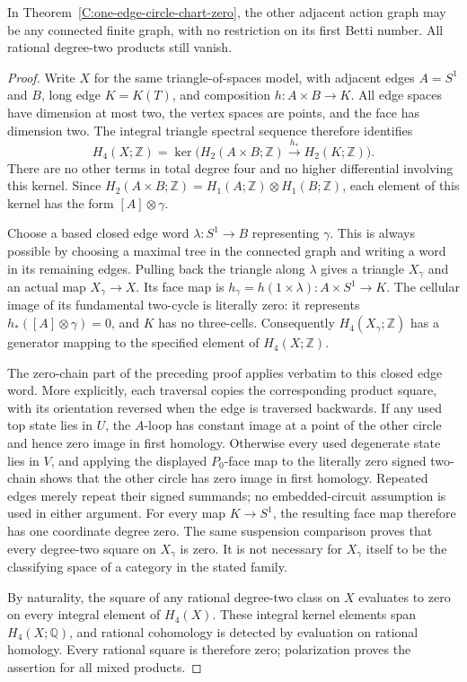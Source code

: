 \begin{corollary}
\label{C:one-edge-arbitrary-graph-cups}
In Theorem~\ref{C:one-edge-circle-chart-zero}, the other adjacent
action graph may be any connected finite graph, with no restriction
on its first Betti number.  All rational degree-two products still
vanish.
\end{corollary}
\begin{proof}
Write $X$ for the same triangle-of-spaces model, with adjacent
edges $A=S^1$ and $B$, long edge $K=K(T)$, and composition
$h:A\times B\to K$.  All edge spaces have dimension at most two,
the vertex spaces are points, and the face has dimension two.
The integral triangle spectral sequence therefore identifies
\[
 H_4(X;\mathbb Z)=
 \ker\bigl(H_2(A\times B;\mathbb Z)
                 \xrightarrow{h_*}H_2(K;\mathbb Z)\bigr).
\]
There are no other terms in total degree four and no higher
differential involving this kernel.  Since
$H_2(A\times B;\mathbb Z)=H_1(A;\mathbb Z)\otimes H_1(B;\mathbb Z)$,
each element of this kernel has the form $[A]\otimes\gamma$.

Choose a based closed edge word $\lambda:S^1\to B$ representing
$\gamma$.  This is always possible by choosing a maximal tree
in the connected graph and writing a word in its remaining edges.
Pulling back the triangle along $\lambda$ gives a triangle
$X_\gamma$ and an actual map $X_\gamma\to X$.  Its face map is
$h_\gamma=h(1\times\lambda):A\times S^1\to K$.
The cellular image of its fundamental two-cycle is literally
zero: it represents $h_*([A]\otimes\gamma)=0$, and $K$ has
no three-cells.  Consequently $H_4(X_\gamma;\mathbb Z)$ has
a generator mapping to the specified element of $H_4(X;\mathbb Z)$.

The zero-chain part of the preceding proof applies verbatim
to this closed edge word.  More explicitly, each traversal
copies the corresponding product square, with its orientation
reversed when the edge is traversed backwards.  If any used
top state lies in $U$, the $A$-loop has constant image at a
point of the other circle and hence zero image in first homology.
Otherwise every used degenerate state lies in $V$, and applying
the displayed $P_0$-face map to the literally zero signed
two-chain shows that the other circle has zero image in first
homology.  Repeated edges merely repeat their signed summands;
no embedded-circuit assumption is used in either argument.
For every map $K\to S^1$, the resulting face map therefore has
one coordinate degree zero.  The same suspension comparison
proves that every degree-two square on $X_\gamma$ is zero.
It is not necessary for $X_\gamma$ itself to be the classifying
space of a category in the stated family.

By naturality, the square of any rational degree-two class on
$X$ evaluates to zero on every integral element of $H_4(X)$.
These integral kernel elements span $H_4(X;\mathbb Q)$, and
rational cohomology is detected by evaluation on rational
homology.  Every rational square is therefore zero; polarization
proves the assertion for all mixed products.
\end{proof}

